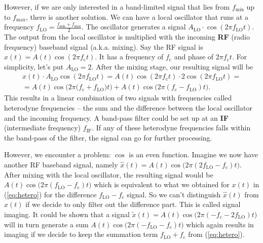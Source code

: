 \documentclass[a4paper,12pt,twoside,openright]{report}
\begin{document}
However, if we are only interested in a band-limited signal that lies from $f_\text{min}$ up to $f_\text{max}$, there is another solution. We can have a local oscillator that runs at a frequency $f_\text{LO} = \frac{f_\text{min}+f_\text{max}}{2}$. The oscillator generates a signal $A_\text{LO} \cdot \cos(2 \pi f_\text{LO} t)$. The output from the local oscillator is multiplied with the incoming \textbf{RF} (radio frequency) baseband signal (a.k.a. mixing). Say the RF signal is $x(t) = A(t) \cos(2 \pi f_\text{c} t)$. It has a frequency of $f_\text{c}$ and phase of $2 \pi f_\text{c} t$. For simplicity, let's put $A_\text{LO} = 2$. After the mixing stage, our resulting signal will be
\begin{multline}
\label{eq:hetero}
x(t) \cdot A_\text{LO} \cos(2 \pi f_\text{LO} t) =  A(t) \cos(2 \pi f_\text{c} t) \cdot 2 \cos(2 \pi f_\text{LO} t) = \\
=  A(t) \cos\big( 2 \pi (f_\text{c} + f_\text{LO} \big) t\big) + A(t) \cos\big( 2 \pi (f_\text{c} - f_\text{LO}) t \big) .
\end{multline}
This results in a linear combination of two signals with frequencies called heterodyne frequencies -- the sum and the difference between the local oscillator and the incoming frequency. A band-pass filter could be set up at an \textbf{IF} (intermediate frequency) $f_\text{IF}$. If any of these heterodyne frequencies falls within the band-pass of the filter, the signal can go for further processing.

However, we encounter a problem: $\cos$ is an even function. Imagine we now have another RF baseband signal, namely $\hat{x}(t) = A(t) \cos\big( 2 \pi (2 f_\text{LO} - f_\text{c}) t\big)$. After mixing with the local oscillator, the resulting signal would be $A(t) \cos\big( 2 \pi (f_\text{LO} - f_\text{c}) t \big)$ which is equivalent to what we obtained for $x(t)$ in (\ref{eq:hetero}) for the difference $f_\text{LO} - f_\text{c}$ signal. So we can't distinguish $\hat{x}(t)$ from $x(t)$ if we decide to only filter out the difference part. This is called signal imaging. It could be shown that a signal $\tilde{x}(t) = A(t) \cos\big( 2 \pi (- f_\text{c} - 2 f_\text{LO}) t\big)$ will in turn generate a sum $A(t) \cos\big( 2 \pi ( - f_\text{LO} - f_\text{c}) t \big)$ which again results in imaging if we decide to keep the summation term $f_\text{LO} + f_\text{c}$ from (\ref{eq:hetero}).
\end{document}
